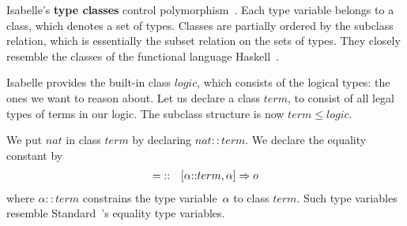 Isabelle's {\bf type classes} control
polymorphism~\cite{nipkow-prehofer}. Each type variable belongs to a
class, which denotes a set of types. Classes are partially ordered by the
subclass relation, which is essentially the subset relation on the sets of
types. They closely resemble the classes of the functional language
Haskell~\cite{haskell-tutorial,haskell-report}.

Isabelle provides the built-in class $logic$, which consists of the logical
types: the ones we want to reason about. Let us declare a class $term$, to
consist of all legal types of terms in our logic. The subclass structure
is now $term\le logic$.

We put $nat$ in class $term$ by declaring $nat{::}term$. We declare the
equality constant by
\begin{eqnarray*}
{=}
    & :: & [\alpha{::}term,\alpha]\Rightarrow o
\end{eqnarray*}
where $\alpha{::}term$ constrains the type variable~$\alpha$ to class
$term$. Such type variables resemble Standard~\ML's equality type
variables.

